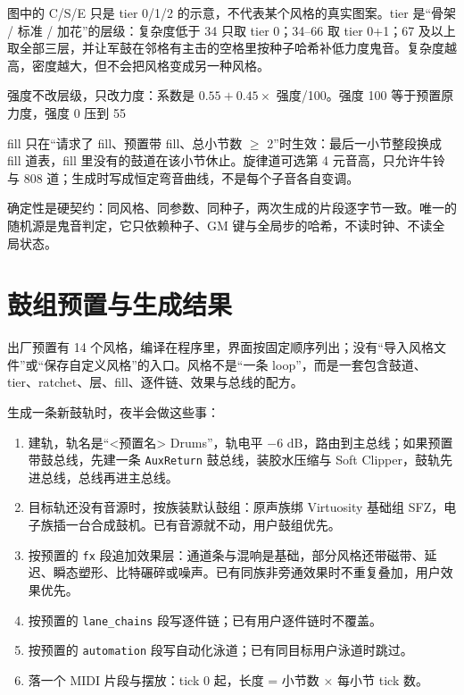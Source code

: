 图中的 C/S/E 只是 tier 0/1/2 的示意，不代表某个风格的真实图案。tier 是“骨架 / 标准 / 加花”的层级：复杂度低于 34 只取 tier 0；34–66 取 tier 0+1；67 及以上取全部三层，并让军鼓在邻格有主击的空格里按种子哈希补低力度鬼音。复杂度越高，密度越大，但不会把风格变成另一种风格。

强度不改层级，只改力度：系数是 $0.55 + 0.45 \times$ 强度/100。强度 100 等于预置原力度，强度 0 压到 55%

fill 只在“请求了 fill、预置带 fill、总小节数 $\geq$ 2”时生效：最后一小节整段换成 fill 道表，fill 里没有的鼓道在该小节休止。旋律道可选第 4 元音高，只允许牛铃与 808 道；生成时写成恒定弯音曲线，不是每个子音各自变调。

确定性是硬契约：同风格、同参数、同种子，两次生成的片段逐字节一致。唯一的随机源是鬼音判定，它只依赖种子、GM 键与全局步的哈希，不读时钟、不读全局状态。

\section{鼓组预置与生成结果}

出厂预置有 14 个风格，编译在程序里，界面按固定顺序列出；没有“导入风格文件”或“保存自定义风格”的入口。风格不是“一条 loop”，而是一套包含鼓道、tier、ratchet、层、fill、逐件链、效果与总线的配方。

生成一条新鼓轨时，夜半会做这些事：

\begin{enumerate}
  \item 建轨，轨名是“<预置名> Drums”，轨电平 −6 dB，路由到主总线；如果预置带鼓总线，先建一条 \texttt{AuxReturn} 鼓总线，装胶水压缩与 Soft Clipper，鼓轨先进总线，总线再进主总线。
  \item 目标轨还没有音源时，按族装默认鼓组：原声族绑 Virtuosity 基础组 SFZ，电子族插一台合成鼓机。已有音源就不动，用户鼓组优先。
  \item 按预置的 \texttt{fx} 段追加效果层：通道条与混响是基础，部分风格还带磁带、延迟、瞬态塑形、比特碾碎或噪声。已有同族非旁通效果时不重复叠加，用户效果优先。
  \item 按预置的 \texttt{lane\_chains} 段写逐件链；已有用户逐件链时不覆盖。
  \item 按预置的 \texttt{automation} 段写自动化泳道；已有同目标用户泳道时跳过。
  \item 落一个 MIDI 片段与摆放：tick 0 起，长度 = 小节数 × 每小节 tick 数。
\end{enumerate}

